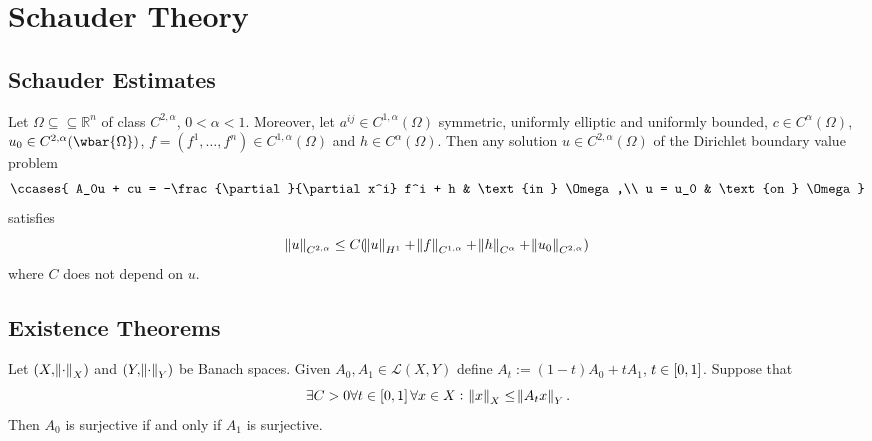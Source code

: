 \section*{Schauder Theory}
\subsection*{Schauder Estimates}

\begin{theorem}
	\label{thm:gSe}
	Let $\Omega \subseteq \subseteq \mathbb{R}^n$ of class $C^{2,\alpha}$, $0 < \alpha < 1$. Moreover, let $a^{ij} \in C^{1,\alpha}(\Omega)$ symmetric, uniformly elliptic and uniformly bounded, $c \in C^\alpha(\Omega)$, $u_0 \in C^{2,\alpha}(\wbar{\Omega})$, $f = (f^1,\dots,f^n) \in C^{1,\alpha}(\Omega)$ and $h \in C^{\alpha}(\Omega)$. Then any solution $u \in C^{2,\alpha}(\Omega)$ of the Dirichlet boundary value problem
	\begin{align*}
		\ccases{
			A_0u + cu = -\frac{\partial}{\partial x^i} f^i + h & \text{in } \Omega,\\
			u = u_0 & \text{on } \Omega
		}
	\end{align*}
	\noindent satisfies
	\begin{equation*}
		\norm{u}_{C^{2,\alpha}} \leq C(\norm{u}_{H^1} + \norm{f}_{C^{1,\alpha}} + \norm{h}_{C^\alpha} + \norm{u_0}_{C^{2,\alpha}})
	\end{equation*}
	\noindent where $C$ does not depend on $u$.
\end{theorem}

\subsection*{Existence Theorems}

\begin{proposition}
	\label{pro:moc}
	Let $(X,\norm{\cdot}_X)$ and $(Y,\norm{\cdot}_Y)$ be Banach spaces. Given $A_0,A_1 \in \mathcal{L}(X,Y)$ define $A_t := (1 - t)A_0 + tA_1$, $t \in \intcc{0,1}$. Suppose that
	\begin{equation*}
		\exists C > 0\forall t \in \intcc{0,1}\forall x \in X:\> \norm{x}_X \leq \norm{A_t x}_Y.
	\end{equation*}
	\noindent Then $A_0$ is surjective if and only if $A_1$ is surjective.
\end{proposition}

